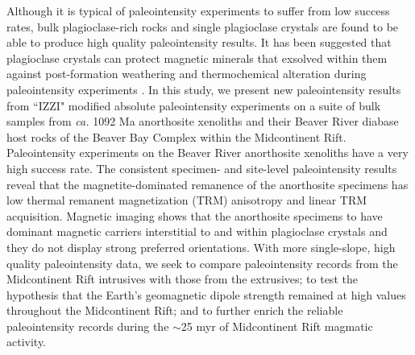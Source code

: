 \documentclass[draft]{agujournal2019}
\begin{document}
Although it is typical of paleointensity experiments to suffer from low success rates, bulk plagioclase-rich rocks \cite{Selkin2000a} and single plagioclase crystals \cite{Tarduno2005a} are found to be able to produce high quality paleointensity results. It has been suggested that plagioclase crystals can protect magnetic minerals that exsolved within them against post-formation weathering and thermochemical alteration during paleointensity experiments \cite{Tarduno2005a}. In this study, we present new paleointensity results from ``IZZI" modified absolute paleointensity experiments \cite{Yu2004a} on a suite of bulk samples from \textit{ca.} 1092 Ma anorthosite xenoliths and their Beaver River diabase host rocks of the Beaver Bay Complex within the Midcontinent Rift. Paleointensity experiments on the Beaver River anorthosite xenoliths have a very high success rate. The consistent specimen- and site-level paleointensity results reveal that the magnetite-dominated remanence of the anorthosite specimens has low thermal remanent magnetization (TRM) anisotropy and linear TRM acquisition. Magnetic imaging shows that the anorthosite specimens to have dominant magnetic carriers interstitial to and within plagioclase crystals and they do not display strong preferred orientations. With more single-slope, high quality paleointensity data, we seek to compare paleointensity records from the Midcontinent Rift intrusives with those from the extrusives; to test the hypothesis that the Earth's geomagnetic dipole strength remained at high values throughout the Midcontinent Rift; and to further enrich the reliable paleointensity records during the $\sim$25 myr of Midcontinent Rift magmatic activity. 

\end{document}
